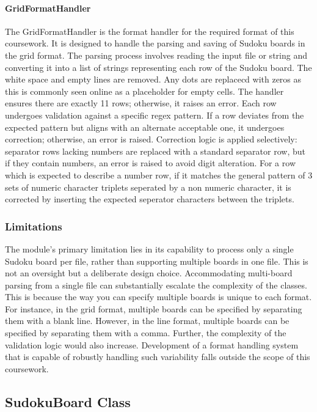 \documentclass[11pt]{article}
\begin{document}
\paragraph{GridFormatHandler}
The GridFormatHandler is the format handler for the required format of this coursework. It is designed to handle the parsing and saving of Sudoku boards in the grid format. The parsing process involves reading the input file or string and converting it into a list of strings representing each row of the Sudoku board. The white space and empty lines are removed. Any dots are replacecd with zeros as this is commonly seen online as a placeholder for empty cells. The handler ensures there are exactly 11 rows; otherwise, it raises an error. Each row undergoes validation against a specific regex pattern. If a row deviates from the expected pattern but aligns with an alternate acceptable one, it undergoes correction; otherwise, an error is raised. Correction logic is applied selectively: separator rows lacking numbers are replaced with a standard separator row, but if they contain numbers, an error is raised to avoid digit alteration. For a row which is expected to describe a number row, if it matches the general pattern of 3 sets of numeric character triplets seperated by a non numeric character, it is corrected by inserting the expected seperator characters between the triplets.
\subsubsection{Limitations}
The module's primary limitation lies in its capability to process only a single Sudoku board per file, rather than supporting multiple boards in one file. This is not an oversight but a deliberate design choice. Accommodating multi-board parsing from a single file can substantially escalate the complexity of the classes. This is because the way you can specify multiple boards is unique to each format. For instance, in the grid format, multiple boards can be specified by separating them with a blank line. However, in the line format, multiple boards can be specified by separating them with a comma. Further, the complexity of the validation logic would also increase. Development of a format handling system that is capable of robustly handling such variability falls outside the scope of this coursework.


\subsection{SudokuBoard Class}
\end{document}
